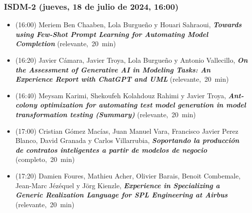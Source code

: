\begin{frame}
  \frametitle{ISDM-2 (jueves, 18 de julio de 2024, 16:00)}
\begin{itemize}


\item {(16:00) Meriem Ben Chaaben, Lola Burgueño y Houari Sahraoui}, %
      {\bfseries\itshape Towards using Few-Shot Prompt Learning for Automating Model Completion} %
      {(relevante,~20~min)}
      

\item {(16:20) Javier Cámara, Javier Troya, Lola Burgueño y Antonio Vallecillo}, %
      {\bfseries\itshape On the Assessment of Generative AI in Modeling Tasks: An Experience Report with ChatGPT and UML} %
      {(relevante,~20~min)}
      

\item {(16:40) Meysam Karimi, Shekoufeh Kolahdouz Rahimi y Javier Troya}, %
      {\bfseries\itshape Ant-colony optimization for automating test model generation in model transformation testing (Summary)} %
      {(relevante,~20~min)}
      

\item {(17:00) Cristian Gómez Macías, Juan Manuel Vara, Francisco Javier Perez Blanco, David Granada y Carlos Villarrubia}, %
      {\bfseries\itshape Soportando la producción de contratos inteligentes a partir de modelos de negocio} %
      {(completo,~20~min)}
      

\item {(17:20) Damien Foures, Mathieu Acher, Olivier Barais, Benoit Combemale, Jean-Marc Jézéquel y Jörg Kienzle}, %
      {\bfseries\itshape Experience in Specializing a Generic Realization Language for SPL Engineering at Airbus} %
      {(relevante,~20~min)}
      

\end{itemize}
\end{frame}